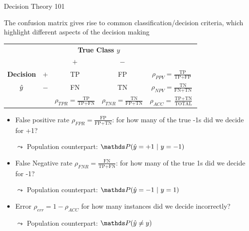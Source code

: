 \begin{vbframe}{Decision Theory 101}
	\footnotesize{
		The confusion matrix gives rise to common classification/decision criteria, which highlight different aspects
		of the decision making
		\begin{center}
			\footnotesize
			\renewcommand{\arraystretch}{1.1}
			\begin{tabular}{cc||cc|c}
				& & \multicolumn{2}{c|}{\bfseries True Class $y$} & \\
				& & $+$ & $-$ & \\ 
				\hline \hline
				\bfseries Decision     & $+$ & TP & FP & $\rho_{PPV} = \frac{\text{TP}}{\text{TP} + \text{FP}}$\\
				$\hat{y}$ & $-$ & FN & TN & $\rho_{NPV} = \frac{\text{TN}}{\text{FN} + \text{TN}}$\\
				\hline
				& & $\rho_{TPR} = \frac{\text{TP}}{\text{TP} + \text{FN}}$ & $\rho_{TNR} = \frac{\text{TN}}{\text{FP} + \text{TN}}$ & $\rho_{ACC} = \frac{\text{TP}+ \text{TN}}{\text{TOTAL}}$
			\end{tabular}
			\renewcommand{\arraystretch}{1}
		\end{center}
		\begin{itemize}
			\item False positive rate $\rho_{FPR} = \frac{\text{FP}}{\text{FP} + \text{TN}}$: for how many of the true -1s did we decide for +1?
			\item [$\leadsto$] Population counterpart: $\P (\yh = +1 ~|~ y= -1)$
			\item False Negative rate $\rho_{FNR} = \frac{\text{FN}}{\text{TP} + \text{FN}}$: for how many of the true 1s did we decide for -1?
			\item [$\leadsto$] Population counterpart: $\P (\yh = -1 ~|~ y= 1)$
			\item Error $\rho_{err} = 1- \rho_{ACC}$ for how many instances did we decide incorrectly?
			\item [$\leadsto$] Population counterpart:  $\P (\yh \neq y  )$
		\end{itemize}
	}
\end{vbframe}



